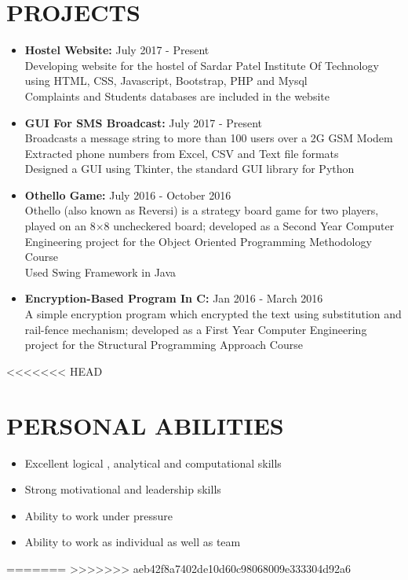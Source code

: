 \documentclass[11pt]{article} %
\newcommand{\NewPart}[1]{\section*{\uppercase{#1}}}
\begin{document}
\NewPart{    Projects}{}
\begin{itemize}
\itemsep-0.5em
\item \textbf{Hostel Website: }\hfill {July 2017 - Present}
\\Developing website for the hostel of Sardar Patel Institute Of Technology using HTML, CSS, Javascript, Bootstrap, PHP and Mysql 
\\Complaints and Students databases are included in the website
\item \textbf{GUI For SMS Broadcast: }\hfill {July 2017 - Present}
\\Broadcasts a message string to more than 100 users over a 2G GSM Modem
\\Extracted phone numbers from Excel, CSV and Text file formats
\\Designed a GUI using Tkinter, the standard GUI library for Python
\item \textbf{Othello Game: }\hfill {July 2016 - October 2016}
\\Othello (also known as Reversi) is a strategy board game for two players, played on an 8×8 uncheckered board; developed as a Second Year Computer Engineering project for the Object Oriented Programming Methodology Course
\\Used Swing Framework in Java 
\item \textbf{Encryption-Based Program In C: }\hfill {Jan 2016 - March 2016}\\A simple encryption program which encrypted the text using substitution and rail-fence mechanism; developed as a First Year Computer Engineering project for the Structural Programming Approach Course
\end{itemize}


<<<<<<< HEAD
 
 
\NewPart{    Personal Abilities}{}

\begin{itemize}
\itemsep-0.5em 
\item Excellent logical , analytical and computational skills
\item Strong motivational and leadership skills
\item Ability to work under pressure 
\item Ability to work as individual as well as team 
\end{itemize}
=======
>>>>>>> aeb42f8a7402de10d60c98068009e333304d92a6
\end{document}
